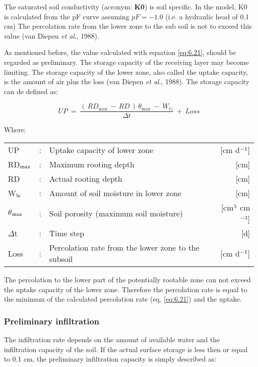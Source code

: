 The saturated soil conductivity (acronym: {\bf K0}) is soil specific. In the
model, K0 is calculated from the pF curve assuming $pF = -1.0$ (i.e. a hydraulic head of 0.1
cm) The percolation rate from the lower zone to the sub soil is not to exceed this value
(van Diepen {\it et al}., 1988). 

As mentioned before, the value calculated with equation \ref{eq:6.21}, should be regarded as
preliminary. The storage capacity of the receiving layer may become limiting. The
storage capacity of the lower zone, also called the uptake capacity, is the amount of air
plus the loss (van Diepen {\it et al}., 1988). The storage capacity can de defined as:

\begin{equation}
\label{eq:6.25}
UP  ~=~{\frac{(\, RD _{\max } \, -\, RD\, )\, \theta  _{\max } ~-~ W _{lz} }{\Delta t}} ~+~ Loss
\end{equation}

Where:\\[5pt]
\begin{tabularx}{\textwidth}{llXr}
	UP &:& Uptake capacity of lower zone  & [cm d$^{{\rm -1}}$]\\
	RD$_{{\rm max}}$ &:& Maximum rooting depth  & [cm]\\
	RD &:& Actual rooting depth  & [cm]\\
	W$_{{\rm lz}}$ &:& Amount of soil moisture in lower zone  & [cm]\\
	$\theta$$_{{\rm max}}$ &:& Soil porosity (maximum soil moisture)  & [cm$^{{\rm 3}}$ cm$^{{\rm -3}}$]\\
	$\Delta$t &:& Time step  & [d]\\
	Loss &:& Percolation rate from the lower zone to the subsoil   & [cm d$^{{\rm -1}}$]\\
\end{tabularx}

The percolation to the lower part of the potentially rootable zone can not exceed the
uptake capacity of the lower zone. Therefore the percolation rate is equal to the minimum
of the calculated percolation rate (eq. \ref{eq:6.21}) and the uptake.

\subsubsection{Preliminary infiltration}
The infiltration rate depends on the amount of available water and the infiltration capacity
of the soil. If the actual surface storage is less then or equal to 0.1 cm, the preliminary
infiltration capacity is simply described as:

